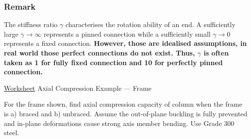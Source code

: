 \subsubsection{Remark}
The stiffness ratio $\gamma$ characterises the rotation ability of an end. A sufficiently large $\gamma\rightarrow\infty$ represents a pinned connection while a sufficiently small $\gamma\rightarrow0$ represents a fixed connection. \textbf{However, those are idealised assumptions, in real world those perfect connections do not exist. Thus, $\gamma$ is often taken as \num{1} for fully fixed connection and \num{10} for perfectly pinned connection.}

\begin{exmp}\href{run:./WORKSHEET/CH04/EX4.ACFM.sm}{Worksheet}
Axial Compression Example --- Frame

For the frame shown, find axial compression capacity of column when the frame is a) braced and b) unbraced. Assume the out-of-plane buckling is fully prevented and in-plane deformations cause strong axis member bending. Use Grade 300 steel.
\begin{figure}[H]

\end{figure}
\end{exmp}
